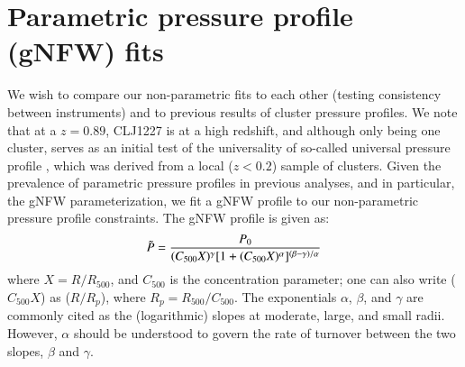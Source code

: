 \documentclass[onecolumn,traditabstract]{aa}
\begin{document}


\section{Parametric pressure profile (gNFW) fits}
\label{sec:parfits}

We wish to compare our non-parametric fits to each other (testing consistency between instruments)
and to previous results of cluster pressure profiles. We note that at a $z = 0.89$, CLJ1227 is at a high redshift,
and although only being one cluster, serves as an initial test of the universality of so-called universal pressure
profile \citep{arnaud2010}, which was derived from a local ($z < 0.2$) sample of clusters.
Given the prevalence of parametric pressure profiles in previous analyses, and in particular, the gNFW parameterization,
we fit a gNFW profile to our non-parametric pressure profile constraints. The gNFW profile is given as:
\begin{equation}
  \Tilde{P} = \frac{P_0}{(C_{500} X)^{\gamma} [1 + (C_{500} X)^{\alpha}]^{(\beta - \gamma)/\alpha}}
  \label{eqn:gnfw_profile}
\end{equation}
where $X = R / R_{500}$, and $C_{500}$ is the concentration parameter; one can also write ($C_{500} X$) as
($R / R_p$), where $R_p = R_{500}/C_{500}$. The exponentials $\alpha$, $\beta$, and $\gamma$ are commonly
cited as the (logarithmic) slopes at moderate, large, and small radii. However, $\alpha$ should be
understood to govern the rate of turnover between the two slopes, $\beta$ and $\gamma$. 

\end{document}
